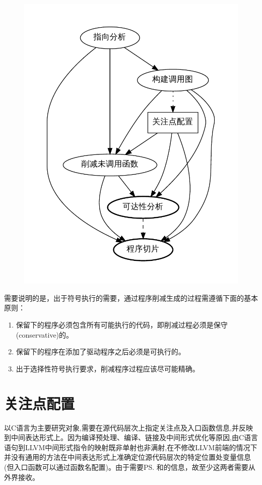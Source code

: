 \begin{figure}[t]
\begin{center}
\includegraphics[width=.6\textwidth]{fig/rb_gen.pdf}
\vspace{-24pt}
\end{center}
\end{figure}

需要说明的是，出于符号执行的需要，通过程序削减生成\rbscope 的过程需遵循下面的基本原则：
\begin{enumerate}
\item 保留下的程序必须包含所有可能执行的代码，即削减过程必须是保守(conservative)的。
\item 保留下的程序在添加了驱动程序之后必须是可执行的。
\item 出于选择性符号执行要求，削减程序过程应该尽可能精确。
\end{enumerate}


\section{关注点配置}
\label{sec:config}
\dryrun 以C语言为主要研究对象,需要在源代码层次上指定关注点及入口函数信息,并反映到中间表达形式上。因为编译预处理、编译、链接及中间形式优化等原因,由C语言语句到LLVM中间形式指令的映射既非单射也非满射,在不修改LLVM前端的情况下并没有通用的方法在中间表达形式上准确定位源代码层次的特定位置处变量信息(但入口函数可以通过函数名配置)。由于\rbscope 需要\prog\ps 和\prog\bs 的信息，故至少这两者需要从外界接收。

